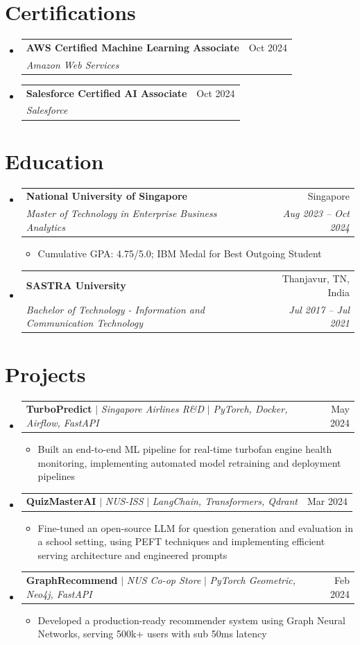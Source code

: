\documentclass[letterpaper,11pt]{article}
\makeatletter
\newcommand{\resumeItem}[1]{
  \item\small{
    {#1 \vspace{-2pt}}
  }
}
\newcommand{\resumeSubheading}[4]{
  \vspace{-2pt}\item
    \begin{tabular*}{0.97\textwidth}[t]{l@{\extracolsep{\fill}}r}
      \textbf{#1} & #2 \\
      \textit{\small#3} & \textit{\small #4} \\
    \end{tabular*}\vspace{-7pt}
}
\newcommand{\resumeProjectHeading}[2]{
    \item
    \begin{tabular*}{0.97\textwidth}{l@{\extracolsep{\fill}}r}
      \small#1 & #2 \\
    \end{tabular*}\vspace{-7pt}
}
\newcommand{\resumeSubHeadingListStart}{\begin{itemize}[leftmargin=0.15in, label={}]}
\newcommand{\resumeSubHeadingListEnd}{\end{itemize}}
\newcommand{\resumeItemListStart}{\begin{itemize}}
\newcommand{\resumeItemListEnd}{\end{itemize}\vspace{-5pt}}
\makeatother
\begin{document}
\section{Certifications}
\resumeSubHeadingListStart
\resumeSubheading
{AWS Certified Machine Learning Associate}{Oct 2024}
{Amazon Web Services}{}
\resumeSubheading
{Salesforce Certified AI Associate}{Oct 2024}
{Salesforce}{}
\resumeSubHeadingListEnd

\section{Education}
\resumeSubHeadingListStart
\resumeSubheading
{National University of Singapore}{Singapore}
{Master of Technology in Enterprise Business Analytics}{Aug 2023 -- Oct 2024}
\resumeItemListStart
\resumeItem{Cumulative GPA: 4.75/5.0; IBM Medal for Best Outgoing Student}
\resumeItemListEnd

\resumeSubheading
{SASTRA University}{Thanjavur, TN, India}
{Bachelor of Technology - Information and Communication Technology}{Jul 2017 -- Jul 2021}
\resumeSubHeadingListEnd

\section{Projects}
\resumeSubHeadingListStart
\resumeProjectHeading
{\textbf{TurboPredict} $|$ \emph{Singapore Airlines R\&D} $|$ \emph{PyTorch, Docker, Airflow, FastAPI}}{May 2024}
\resumeItemListStart
\resumeItem{Built an end-to-end ML pipeline for real-time turbofan engine health monitoring, implementing automated model retraining and deployment pipelines}
\resumeItemListEnd

\resumeProjectHeading
{\textbf{QuizMasterAI} $|$ \emph{NUS-ISS} $|$ \emph{LangChain, Transformers, Qdrant}}{Mar 2024}
\resumeItemListStart
\resumeItem{Fine-tuned an open-source LLM for question generation and evaluation in a school setting, using PEFT techniques and implementing efficient serving architecture and engineered prompts}
\resumeItemListEnd

\resumeProjectHeading
{\textbf{GraphRecommend} $|$ \emph{NUS Co-op Store} $|$ \emph{PyTorch Geometric, Neo4j, FastAPI}}{Feb 2024}
\resumeItemListStart
\resumeItem{Developed a production-ready recommender system using Graph Neural Networks, serving 500k+ users with sub 50ms latency}
\resumeItemListEnd
\resumeSubHeadingListEnd
\end{document}
